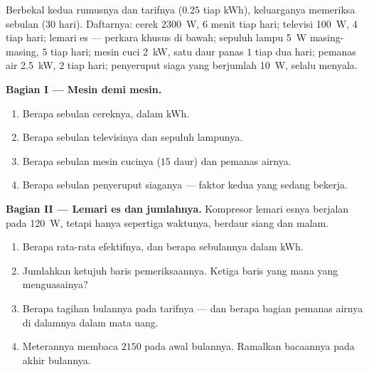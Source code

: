 \begin{problem}\label{pb:g9:electric-power-energy:1}
Berbekal kedua rumusnya dan tarifnya ($0.25$ tiap \unit{kWh}),
keluarganya memeriksa sebulan (30 hari). Daftarnya: cerek
\qty{2300}{W}, $6$ menit tiap hari; televisi \qty{100}{W}, $4$ 
tiap hari; lemari es --- perkara khusus di bawah; sepuluh lampu
\qty{5}{W} masing-masing, $5$  tiap hari; mesin cuci \qty{2}{kW},
satu daur panas $1$  tiap dua hari; pemanas air \qty{2.5}{kW}, $2$
 tiap hari; penyeruput siaga yang berjumlah \qty{10}{W}, selalu
menyala.

\medskip\noindent\textbf{Bagian I --- Mesin demi mesin.}
\begin{enumerate}
  \item Berapa sebulan cereknya, dalam \unit{kWh}.
  \item Berapa sebulan televisinya dan sepuluh lampunya.
  \item Berapa sebulan mesin cucinya ($15$ daur) dan pemanas airnya.
  \item Berapa sebulan penyeruput siaganya --- faktor kedua yang
        sedang bekerja.
\end{enumerate}

\medskip\noindent\textbf{Bagian II --- Lemari es dan
jumlahnya.}
Kompresor lemari esnya berjalan pada \qty{120}{W}, tetapi hanya
sepertiga waktunya, berdaur siang dan malam.
\begin{enumerate}[resume]
  \item Berapa  rata-rata efektifnya, dan berapa sebulannya dalam
        \unit{kWh}.
  \item Jumlahkan ketujuh baris pemeriksaannya. Ketiga baris yang mana
        yang menguasainya?
  \item Berapa tagihan bulannya pada tarifnya --- dan berapa bagian
        pemanas airnya di dalamnya dalam mata uang.
  \item Meterannya membaca $2150$  pada awal bulannya. Ramalkan
        bacaannya pada akhir bulannya.
\end{enumerate}


\end{problem}
